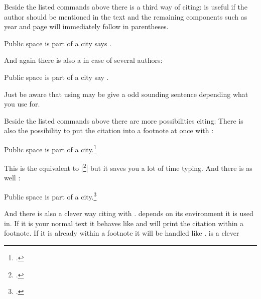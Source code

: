 \documentclass[a4paper,
10pt,
greek,
french,
spanish,
italian,
ngerman,
english
]{ltxdoc}
\begin{document}
\DescribeMacro{\textcite}
Beside the listed  commands above there is a third way of citing:
 is useful if the author should be mentioned in the text and
the remaining components such as year and page will immediately follow in parentheses. 

\begin{example}
Public space is part of a city says \textcite{Osland2016}.
\end{example}

\DescribeMacro{\textcites}
And again there is also a  in case of several authors: 
\begin{example}
Public space is part of a city say \textcites{Osland2016}[cf.][]{Evangelidis2014}.
\end{example}
Just be aware that using  may be give a odd sounding sentence depending what you use  for.

 \DescribeMacro{\footcite}
 Beside the listed  commands above there are more possibilities citing:
 There is also the possibility to put the citation into a footnote at once with :
\begin{example}
Public space is part of a city.\footcite{Osland2016}
\end{example}
This is the equivalent to |\footnote{\cite{Osland2016}.}| but it saves you a lot of time typing.
 \DescribeMacro{\footcites} And there is as well :
\begin{example}
Public space is part of a city.\footcites(cf.)(){Osland2016}{Evangelidis2014}
\end{example}
 
 
\DescribeMacro{\smartcite}
And there is also a clever way citing with .
 depends on its environment it is used in. If it is your normal text it behaves like  and will print the citation within a footnote.
If it is already within a footnote it will be handled like . 
 is a clever 
\end{document}

